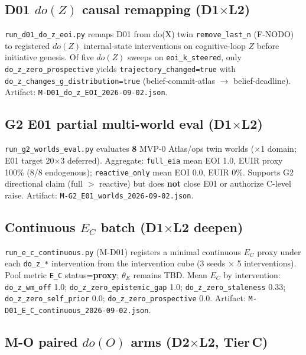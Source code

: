 \subsection{D01 $do(Z)$ causal remapping (D1$\times$L2)}

\texttt{run\_d01\_do\_z\_eoi.py} remaps D01 from do(X) twin \texttt{remove\_last\_n} (F-NODO) to registered $do(Z)$ internal-state interventions on cognitive-loop $Z$ before initiative genesis. Of five $do(Z)$ sweeps on \texttt{eoi\_k\_steered}, only \texttt{do\_z\_zero\_prospective} yields \texttt{trajectory\_changed=true} with \texttt{do\_z\_changes\_g\_distribution=true} (belief-commit-atlas $\to$ belief-deadline). Artifact: \texttt{M-D01\_do\_z\_EOI\_2026-09-02.json}.

\subsection{G2 E01 partial multi-world eval (D1$\times$L2)}

\texttt{run\_g2\_worlds\_eval.py} evaluates \textbf{8} MVP-0 Atlas/ops twin worlds ($\times$1 domain; E01 target 20$\times$3 deferred). Aggregate: \texttt{full\_eia} mean EOI 1.0, EUIR proxy 100\% (8/8 endogenous); \texttt{reactive\_only} mean EOI 0.0, EUIR 0\%. Supports G2 directional claim (full $>$ reactive) but does \textbf{not} close E01 or authorize C-level raise. Artifact: \texttt{M-G2\_E01\_worlds\_2026-09-02.json}.

\subsection{Continuous $E_C$ batch (D1$\times$L2 deepen)}

\texttt{run\_e\_c\_continuous.py} (M-D01) registers a minimal continuous $E_C$ proxy under each \texttt{do\_z\_*} intervention from the intervention cube (3 seeds $\times$ 5 interventions). Pool metric \texttt{E\_C} status=\textbf{proxy}; $\theta_E$ remains TBD. Mean $E_C$ by intervention: \texttt{do\_z\_wm\_off} 1.0; \texttt{do\_z\_zero\_epistemic\_gap} 1.0; \texttt{do\_z\_zero\_staleness} 0.33; \texttt{do\_z\_zero\_self\_prior} 0.0; \texttt{do\_z\_zero\_prospective} 0.0. Artifact: \texttt{M-D01\_E\_C\_continuous\_2026-09-02.json}.

\subsection{M-O paired $do(O)$ arms (D2$\times$L2, Tier\,C)}

